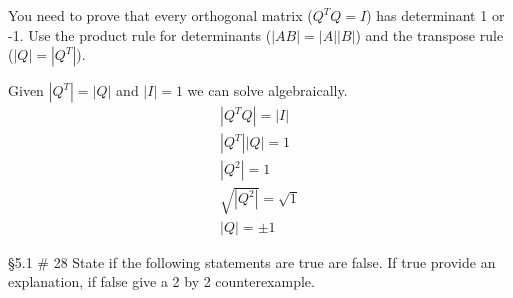 \documentclass[]{exam}
\begin{document}
\begin{questions}
	\question You need to prove that every orthogonal matrix ($Q^TQ = I$) has determinant 1 or -1. Use the product rule for determinants ($|AB| = |A| |B|$) and the transpose rule ($|Q| = |Q^T|$).
	\begin{solution}
		Given $|Q^T|=|Q|$ and $|I|=1$ we can solve algebraically. 
		\begin{gather*}
		    |Q^TQ|=|I| \\
		    |Q^T||Q|= 1 \\
		    |Q^2| = 1 \\
		    \sqrt{|Q^2|}= \sqrt{1} \\
		    |Q|=\pm 1 
		\end{gather*}
	\end{solution}
			
	
	\question \S 5.1 \# 28 State if the following statements are true are false. If true provide an explanation, if false give a 2 by 2 counterexample.
	
\end{questions}
\end{document}
